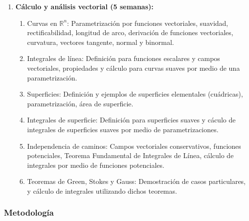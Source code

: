\begin{refsection}
\begin{enumerate}
\item \textbf{C\'alculo y an\'alisis vectorial (5 semanas):} 
\begin{enumerate}
\item Curvas en $\mathbb{R}^n$: Parametrizaci\'on por funciones vectoriales, suavidad, rectificabilidad, longitud de arco, derivaci\'on de funciones vectoriales, curvatura, vectores tangente, normal y binormal.
\item Integrales de l\'inea: Definici\'on para funciones escalares y campos vectoriales, propiedades y c\'alculo para curvas suaves por medio de una parametrizaci\'on.
\item Superficies: Definici\'on y ejemplos de superficies elementales (cu\'adricas), parametrizaci\'on, \'area de superficie.
\item Integrales de superficie: Definici\'on para superficies suaves y c\'aculo de integrales de superficies suaves por medio de parametrizaciones. 
\item Independencia de caminos: Campos vectoriales conservativos, funciones potenciales, Teorema Fundamental de Integrales de L\'inea, c\'alculo de integrales por medio de funciones potenciales. 
\item Teoremas de Green, Stokes y Gauss: Demostraci\'on de casos particulares, y c\'alculo de integrales utilizando dichos teoremas. 
\end{enumerate}

\end{enumerate}

\subsubsection*{Metodología}


\end{refsection}

